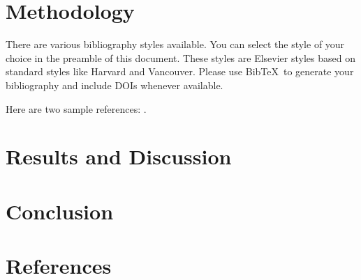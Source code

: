 \documentclass[review]{elsarticle}
\begin{document}
\section{Methodology}
\label{sec:method}
There are various bibliography styles available. You can select the style of your choice in the preamble of this document. These styles are Elsevier styles based on standard styles like Harvard and Vancouver. Please use Bib\TeX\ to generate your bibliography and include DOIs whenever available.

Here are two sample references: \cite{Thakur2012, Leinss2014, Cloude1998, Cloude2010}.

\section{Results and Discussion}
\label{sec:res}
\section{Conclusion}
\label{sec:conc}

\section*{References}


\end{document}
